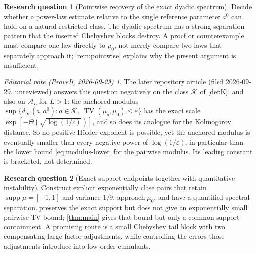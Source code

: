 \documentclass[11pt,a4paper]{article}
\theoremstyle{definition}
\newtheorem{question}{Research question}
\theoremstyle{remark}
\newtheorem*{ednote}{Editorial note (ProveIt, 2026-09-29)}
\DeclareMathOperator{\TV}{TV}
\DeclareMathOperator{\supp}{supp}
\newcommand{\A}{\mathcal A}
\newcommand{\K}{\mathcal K}
\newcommand{\eps}{\varepsilon}
\begin{document}
\begin{question}[Pointwise recovery of the exact dyadic spectrum]
Decide whether a power-law estimate relative to the single reference
parameter $a^0$ can hold on a natural restricted class. The dyadic
spectrum has a strong separation pattern that the inserted Chebyshev
blocks destroy. A proof or counterexample must compare one law directly
to $\mu_0$, not merely compare two laws that separately approach it;
\cref{rem:pointwise} explains why the present argument is insufficient.
\end{question}
\begin{ednote}
The later repository article
 (filed
2026-09-29, unreviewed) answers this question negatively on the class $\K$
of \cref{def:K}, and also on $\A_L$ for $L>1$: the anchored modulus
$\sup\{d_\infty(a,a^0):a\in\K,\ \TV(\mu_a,\mu_0)\le\eps\}$ has the exact
scale $\exp[-\Theta(\sqrt{\log(1/\eps)})]$, and so does its analogue for
the Kolmogorov distance. So no positive H\"older exponent is possible, yet
the anchored modulus is eventually smaller than every negative power of
$\log(1/\eps)$, in particular than the lower bound
\eqref{eq:modulus-lower} for the pairwise modulus. Its leading constant is
bracketed, not determined.
\end{ednote}

\begin{question}[Exact support endpoints together with quantitative instability]
Construct explicit exponentially close pairs that retain
$\supp\mu=[-1,1]$ and variance $1/9$, approach $\mu_0$, and have a
quantified spectral separation.  preserves the exact
support but does not give an exponentially small pairwise TV bound;
\cref{thm:main} gives that bound but only a common support containment.
A promising route is a small Chebyshev tail block with two compensating
large-factor adjustments, while controlling the errors those adjustments
introduce into low-order cumulants.
\end{question}
\end{document}

